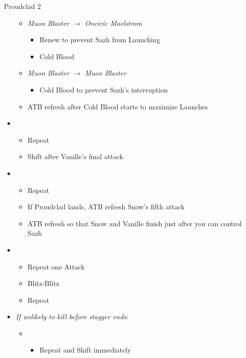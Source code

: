 \begin{battle}[2:01]{Proudclad 2}
\begin{itemize}
\begin{itemize}
\begin{itemize}
				            \end{itemize}
				      \item \textit{Muon Blaster $\rightarrow$ Oneiric Maelstrom}
				            \begin{itemize}
					            \item Renew to prevent Sazh from Launching
					            \item Cold Blood
				            \end{itemize}
				      \item \textit{Muon Blaster $\rightarrow$ Muon Blaster}
				            \begin{itemize}
					            \item Cold Blood to prevent Sazh's interruption
				            \end{itemize}
				      \item ATB refresh after Cold Blood starts to maximize Launches
			      \end{itemize}
			\item \fifth
			      \begin{itemize}
				      \item Repeat
				      \item Shift after Vanille's final attack
			      \end{itemize}
			\item \first
			      \begin{itemize}
				      \item Repeat
				      \item If Proudclad lands, ATB refresh Snow's fifth attack
				      \item ATB refresh so that Snow and Vanille finish just after you can control Sazh
			      \end{itemize}
			\item \second
			      \begin{itemize}
				      \item Repeat one Attack
				      \item Blitz-Blitz
				      \item Repeat
			      \end{itemize}
			\item \textit{If unlikely to kill before stagger ends}:
			      \begin{itemize}
				      \item \first
				            \begin{itemize}
					            \item Repeat and Shift immediately

\end{itemize}
\end{itemize}
\end{itemize}
\end{battle}
